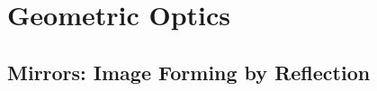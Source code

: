 \chapter{Geometric Optics}
\label{chapter:geom-optics}


\section{Mirrors: Image Forming by Reflection}
%




%
%
%

%
%

